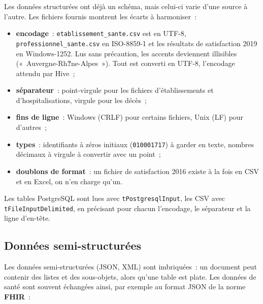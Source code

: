 \noindent Les données structurées ont déjà un schéma, mais celui-ci varie d'une source à l'autre. Les fichiers fournis montrent les écarts à harmoniser~:
\begin{itemize}
	\item \textbf{encodage}~: \texttt{etablissement\_sante.csv} est en UTF-8, \texttt{professionnel\_sante.csv} en ISO-8859-1 et les résultats de satisfaction 2019 en Windows-1252. Lus sans précaution, les accents deviennent illisibles («~Auvergne-Rh\textbf{?}ne-Alpes~»). Tout est converti en UTF-8, l'encodage attendu par Hive~;
	\item \textbf{séparateur}~: point-virgule pour les fichiers d'établissements et d'hospitalisations, virgule pour les décès~;
	\item \textbf{fins de ligne}~: Windows (CRLF) pour certains fichiers, Unix (LF) pour d'autres~;
	\item \textbf{types}~: identifiants à zéros initiaux (\texttt{010001717}) à garder en texte, nombres décimaux à virgule à convertir avec un point~;
	\item \textbf{doublons de format}~: un fichier de satisfaction 2016 existe à la fois en CSV et en Excel, on n'en charge qu'un.
\end{itemize}
Les tables PostgreSQL sont lues avec \texttt{tPostgresqlInput}, les CSV avec \texttt{tFileInput\-Delimited}, en précisant pour chacun l'encodage, le séparateur et la ligne d'en-tête.

\subsection{Données semi-structurées}

\noindent Les données semi-structurées (JSON, XML) sont imbriquées~: un document peut contenir des listes et des sous-objets, alors qu'une table est plate. Les données de santé sont souvent échangées ainsi, par exemple au format JSON de la norme \textbf{FHIR}~:

